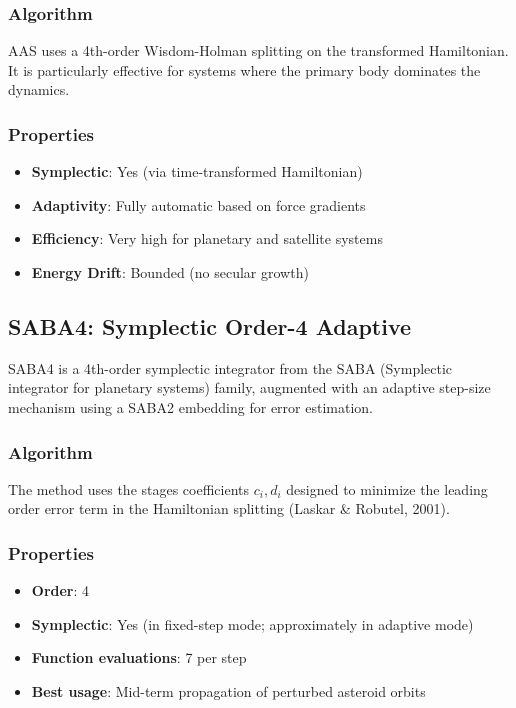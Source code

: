 \subsubsection{Algorithm}

AAS uses a 4th-order Wisdom-Holman splitting on the transformed Hamiltonian. It is particularly effective for systems where the primary body dominates the dynamics.

\subsubsection{Properties}

\begin{itemize}
    \item \textbf{Symplectic}: Yes (via time-transformed Hamiltonian)
    \item \textbf{Adaptivity}: Fully automatic based on force gradients
    \item \textbf{Efficiency}: Very high for planetary and satellite systems
    \item \textbf{Energy Drift}: Bounded (no secular growth)
\end{itemize}

\subsection{SABA4: Symplectic Order-4 Adaptive}
\label{subsec:saba4_integrator}

SABA4 is a 4th-order symplectic integrator from the SABA (Symplectic integrator for planetary systems) family, augmented with an adaptive step-size mechanism using a SABA2 embedding for error estimation.

\subsubsection{Algorithm}

The method uses the stages coefficients $c_i, d_i$ designed to minimize the leading order error term in the Hamiltonian splitting (Laskar \& Robutel, 2001).

\subsubsection{Properties}

\begin{itemize}
    \item \textbf{Order}: 4
    \item \textbf{Symplectic}: Yes (in fixed-step mode; approximately in adaptive mode)
    \item \textbf{Function evaluations}: 7 per step
    \item \textbf{Best usage}: Mid-term propagation of perturbed asteroid orbits
\end{itemize}

